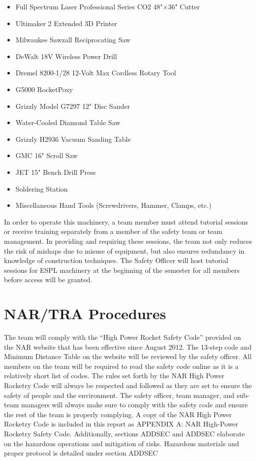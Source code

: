 \begin{itemize}[noitemsep]
    \item Full Spectrum Laser Professional Series CO2 48"$\times$36"  Cutter
    \item  Ultimaker 2 Extended 3D Printer
    \item Milwaukee Sawzall Reciprocating Saw
    \item DeWalt 18V Wireless Power Drill
    \item Dremel 8200-1/28 12-Volt Max Cordless Rotary Tool
    \item G5000 RocketPoxy
    \item Grizzly Model G7297 12" Disc Sander
    \item Water-Cooled Diamond Table Saw
    \item Grizzly H2936 Vacuum Sanding Table
    \item GMC 16" Scroll Saw
    \item JET 15" Bench Drill Press
    \item Soldering Station
    \item Miscellaneous Hand Tools (Screwdrivers, Hammer, Clamps, etc.)
\end{itemize}

In order to operate this machinery, a team member must attend tutorial sessions or receive training separately from a member of the safety team or team management. In providing and requiring these sessions, the team not only reduces the risk of mishaps due to misuse of equipment, but also ensures redundancy in knowledge of construction techniques. The Safety Officer will host tutorial sessions for ESPL machinery at the beginning of the semester for all members before access will be granted.

\section{NAR/TRA Procedures}

The team will comply with the ``High Power Rocket Safety Code'' provided on the NAR website that has been effective since August 2012. The 13-step code and Minimum Distance Table on the website will be reviewed by the safety officer. All members on the team will be required to read the safety code online as it is a relatively short list of codes. The rules set forth by the NAR High Power Rocketry Code will always be respected and followed as they are set to ensure the safety of people and the environment. The safety officer, team manager, and sub-team managers will always make sure to comply with the safety code and ensure the rest of the team is properly complying. A copy of the NAR High Power Rocketry Code is included in this report as APPENDIX A: NAR High-Power Rocketry Safety Code. Additionally, sections ADDSEC and ADDSEC elaborate on the hazardous operations and mitigation of risks. Hazardous materials and proper protocol is detailed under section ADDSEC

